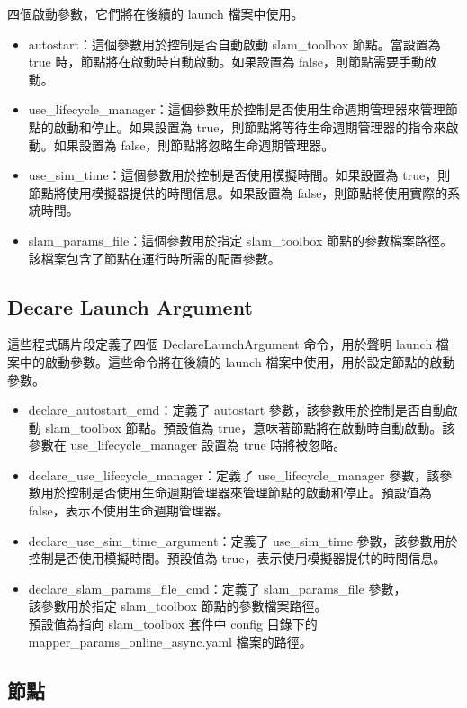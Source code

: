 四個啟動參數，它們將在後續的 launch 檔案中使用。
\begin{itemize}
    \item autostart：這個參數用於控制是否自動啟動 slam\_toolbox 節點。當設置為 true 時，節點將在啟動時自動啟動。如果設置為 false，則節點需要手動啟動。
    \item use\_lifecycle\_manager：這個參數用於控制是否使用生命週期管理器來管理節點的啟動和停止。如果設置為 true，則節點將等待生命週期管理器的指令來啟動。如果設置為 false，則節點將忽略生命週期管理器。
    \item use\_sim\_time：這個參數用於控制是否使用模擬時間。如果設置為 true，則節點將使用模擬器提供的時間信息。如果設置為 false，則節點將使用實際的系統時間。
    \item slam\_params\_file：這個參數用於指定 slam\_toolbox 節點的參數檔案路徑。該檔案包含了節點在運行時所需的配置參數。
\end{itemize}

\subsection{Decare Launch Argument}
這些程式碼片段定義了四個 DeclareLaunchArgument 命令，用於聲明 launch 檔案中的啟動參數。這些命令將在後續的 launch 檔案中使用，用於設定節點的啟動參數。

\begin{itemize}
    \item declare\_autostart\_cmd：定義了 autostart 參數，該參數用於控制是否自動啟動 slam\_toolbox 節點。預設值為 true，意味著節點將在啟動時自動啟動。該參數在 use\_lifecycle\_manager 設置為 true 時將被忽略。
    \item declare\_use\_lifecycle\_manager：定義了 use\_lifecycle\_manager 參數，該參數用於控制是否使用生命週期管理器來管理節點的啟動和停止。預設值為 false，表示不使用生命週期管理器。
    \item declare\_use\_sim\_time\_argument：定義了 use\_sim\_time 參數，該參數用於控制是否使用模擬時間。預設值為 true，表示使用模擬器提供的時間信息。
    \item declare\_slam\_params\_file\_cmd：定義了 slam\_params\_file 參數，\\
        該參數用於指定 slam\_toolbox 節點的參數檔案路徑。\\
        預設值為指向 slam\_toolbox 套件中 config 目錄下的 mapper\_params\_online\_async.yaml 檔案的路徑。
\end{itemize}

\subsection{節點}

